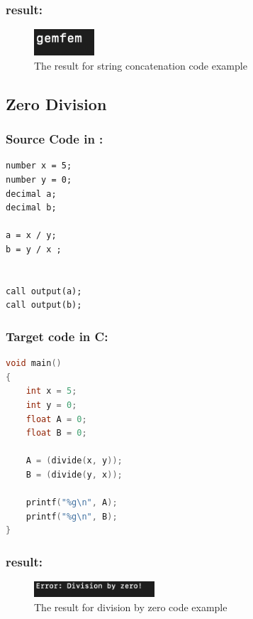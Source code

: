  \subsubsection{result:}
\begin{figure}[H] 
    \begin{center}
        \includegraphics[width=0.2\textwidth]{Files/Billeder: Appendix/stringconc.png}
    \end{center}
    \caption{The result for string concatenation code example}
    \label{figure:stringconc_result}
\end{figure}


\subsection{Zero Division}

\subsubsection{Source Code in \lang:}
\begin{lstlisting}[language = scriptkid, firstnumber=1, label={list:acceptance_test_zerodiv}, caption=Acceptance test division by zero code examples]
number x = 5;
number y = 0;
decimal a;
decimal b;

a = x / y;
b = y / x ;


call output(a);
call output(b);
\end{lstlisting}

\subsubsection{Target code in C:}
\begin{lstlisting}[language = C, firstnumber=1, label={list:acceptance_test_zerodiv_output}, caption=Acceptance test division by zero code examples in C]
void main()
{
    int x = 5;
    int y = 0;
    float A = 0;
    float B = 0;
    
    A = (divide(x, y));
    B = (divide(y, x));
    
    printf("%g\n", A);
    printf("%g\n", B);
}
\end{lstlisting}


 \subsubsection{result:}
\begin{figure}[H] 
    \begin{center}
        \includegraphics[width=0.4\textwidth]{Files/Billeder: Appendix/ZeroDiv.png}
    \end{center}
    \caption{The result for division by zero code example}
    \label{figure:zerodiv_result}
\end{figure}

